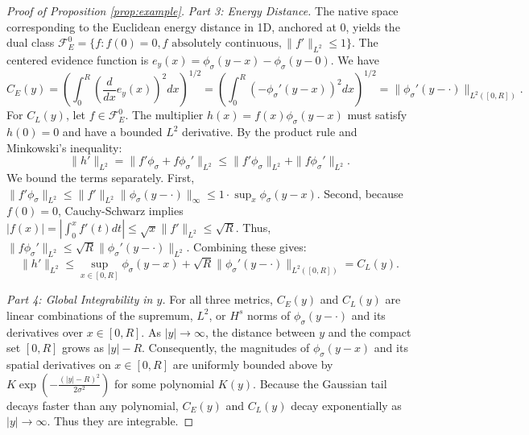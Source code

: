 \documentclass[twoside,11pt]{article}
\begin{document}
\begin{proof}[Proof of Proposition \ref{prop:example}]
\textit{Part 3: Energy Distance.} The native space corresponding to the Euclidean energy distance in 1D, anchored at $0$, yields the dual class $\mathcal{F}_E^0 = \{f : f(0)=0, f \text{ absolutely continuous}, \|f'\|_{L^2} \le 1\}$. The centered evidence function is $e_y(x) = \phi_\sigma(y-x) - \phi_\sigma(y-0)$. We have 
$$C_E(y) = \left( \int_0^R \left( \frac{d}{dx} e_y(x) \right)^2 dx \right)^{1/2} = \left( \int_0^R (-\phi_\sigma'(y-x))^2 dx \right)^{1/2} = \|\phi_\sigma'(y-\cdot)\|_{L^2([0,R])}.$$
For $C_L(y)$, let $f \in \mathcal{F}_E^0$. The multiplier $h(x) = f(x)\phi_\sigma(y-x)$ must satisfy $h(0)=0$ and have a bounded $L^2$ derivative. By the product rule and Minkowski's inequality:$$\|h'\|_{L^2} = \|f' \phi_\sigma + f \phi_\sigma'\|_{L^2} \le \|f' \phi_\sigma\|_{L^2} + \|f \phi_\sigma'\|_{L^2}.$$We bound the terms separately. First, $\|f' \phi_\sigma\|_{L^2} \le \|f'\|_{L^2} \|\phi_\sigma(y-\cdot)\|_\infty \le 1 \cdot \sup_x \phi_\sigma(y-x)$. Second, because $f(0)=0$, Cauchy-Schwarz implies $|f(x)| = |\int_0^x f'(t)dt| \le \sqrt{x} \|f'\|_{L^2} \le \sqrt{R}$. Thus, $\|f \phi_\sigma'\|_{L^2} \le \sqrt{R} \|\phi_\sigma'(y-\cdot)\|_{L^2}$. Combining these gives:$$\|h'\|_{L^2} \le \sup_{x \in [0,R]} \phi_\sigma(y-x) + \sqrt{R} \|\phi_\sigma'(y-\cdot)\|_{L^2([0,R])} = C_L(y).$$

\textit{Part 4: Global Integrability in $y$.} For all three metrics, $C_E(y)$ and $C_L(y)$ are linear combinations of the supremum, $L^2$, or $H^s$ norms of $\phi_\sigma(y-\cdot)$ and its derivatives over $x \in [0,R]$.
As $|y| \to \infty$, the distance between $y$ and the compact set $[0,R]$ grows as $|y| - R$. Consequently, the magnitudes of $\phi_\sigma(y-x)$ and its spatial derivatives on $x \in [0,R]$ are uniformly bounded above by $K \exp\left( - \frac{(|y|-R)^2}{2\sigma^2} \right)$ for some polynomial $K(y)$.
Because the Gaussian tail decays faster than any polynomial, $C_E(y)$ and $C_L(y)$ decay exponentially as $|y| \to \infty$. Thus they are integrable.
\end{proof}
\end{document}
